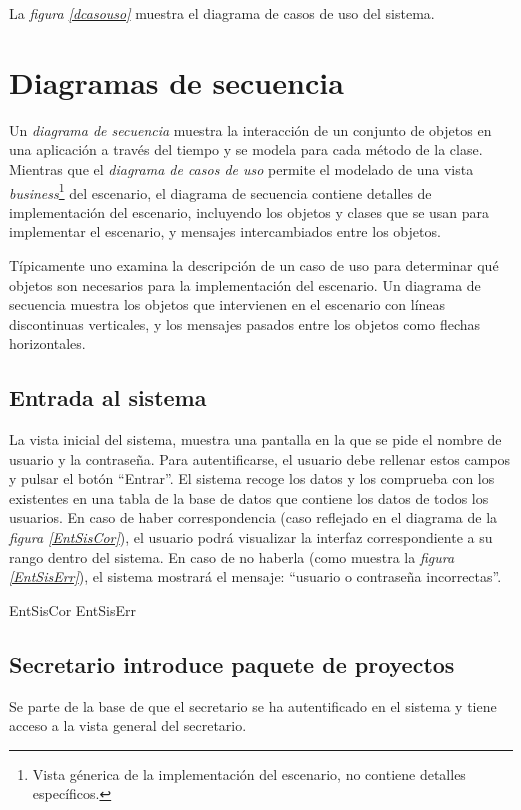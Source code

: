 \documentclass[11pt,a4paper,spanish,twoside]{book}
\begin{document}
La \emph{figura \ref{dcasouso}} muestra el diagrama de casos de uso del
sistema.


\chapter{Diagramas de secuencia}
Un \emph{diagrama de secuencia} muestra la interacción de un conjunto de
objetos en una aplicación a través del tiempo y se modela para cada método de
la clase. Mientras que el \emph{diagrama de casos de uso} permite el modelado
de una vista \emph{business}\footnote{Vista génerica de la implementación del
escenario, no contiene detalles específicos.} del escenario, el diagrama de 
secuencia contiene detalles de implementación del escenario, incluyendo los 
objetos y clases que se usan para implementar el escenario, y mensajes 
intercambiados entre los objetos.

Típicamente uno examina la descripción de un caso de uso para determinar qué
objetos son necesarios para la implementación del escenario. Un diagrama de 
secuencia muestra los objetos que intervienen en el escenario con líneas 
discontinuas verticales, y los mensajes pasados entre los objetos como
flechas horizontales.

\section{Entrada al sistema}
La vista inicial del sistema, muestra una pantalla en la que se pide el nombre
de usuario y la contraseña. Para autentificarse, el usuario debe rellenar
estos campos y pulsar el botón ``Entrar''. El sistema recoge los datos y los
comprueba con los existentes en una tabla de la base de datos que contiene los
datos de todos los usuarios. En caso de haber correspondencia (caso reflejado
en el diagrama de la \emph{figura \ref{EntSisCor}}), el usuario podrá
visualizar la interfaz correspondiente a su rango dentro del sistema. En caso
de no haberla (como muestra la \emph{figura \ref{EntSisErr}}), el sistema 
mostrará el mensaje: ``usuario o contraseña incorrectas''.

{EntSisCor}
{EntSisErr}

\section{Secretario introduce paquete de proyectos}
Se parte de la base de que el secretario se ha autentificado en el sistema y
tiene acceso a la vista general del secretario.
\end{document}
